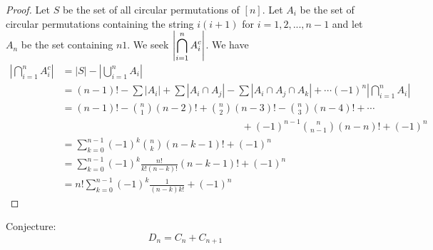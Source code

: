 \documentclass[handout]{ximera}
\begin{document}
\begin{proof}
Let $S$ be the set of all circular permutations of $[n]$. Let $A_i$ be the set of circular permutations 
containing the string $i(i+1)$ for $i = 1, 2, ..., n-1$
and let $A_n$ be the set containing $n1$. We seek $\displaystyle \left|\bigcap_{i=1}^n A_i^c\right|$. We have
\begin{align*}
\left|\bigcap_{i=1}^n A_i^c\right| &= |S| - \left|\bigcup_{i=1}^n A_i\right|\\
&= (n-1)! - \sum |A_i| + \sum |A_i \cap A_j| - \sum |A_i \cap A_j \cap A_k| + \cdots (-1)^n \left|\bigcap_{i=1}^n A_i\right|\\
&= (n-1)! - \binom{n}{1} (n-2)! + \binom{n}{2} (n-3)! - \binom{n}{3} (n-4)! + \cdots \\
 & \qquad \qquad\qquad\qquad\qquad\qquad\qquad\qquad\qquad+ (-1)^{n-1} \binom{n}{n-1} (n-n)! + (-1)^n\\
&= \sum_{k=0}^{n-1} (-1)^k \binom{n}{k} (n-k-1)! + (-1)^n\\
&= \sum_{k=0}^{n-1} (-1)^k \frac{n!}{k!(n-k)!} (n-k-1)! + (-1)^n\\
&= n! \sum_{k=0}^{n-1} (-1)^k \frac{1}{(n-k) k!} + (-1)^n
\end{align*}
\end{proof}


Conjecture:
\[
D_n = C_n + C_{n+1}
\]
\end{document}
